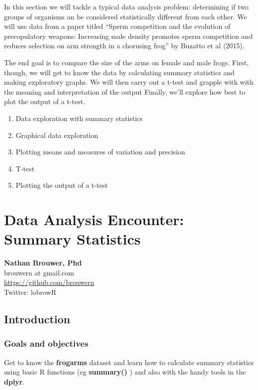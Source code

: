 \documentclass[]{book}
\providecommand{\tightlist}{%
  \setlength{\itemsep}{0pt}\setlength{\parskip}{0pt}}
\theoremstyle{definition}
\theoremstyle{definition}
\theoremstyle{definition}
\theoremstyle{remark}
\begin{document}
In this section we will tackle a typical data analysis problem:
determining if two groups of organisms an be considered statistically
different from each other. We will use data from a paper titled ``Sperm
competition and the evolution of precopulatory weapons: Increasing male
density promotes sperm competition and reduces selection on arm strength
in a chorusing frog'' by Buzatto et al (2015).

The end goal is to compare the size of the arms on female and male
frogs. First, though, we will get to know the data by calculating
summary statistics and making exploratory graphs. We will then carry out
a t-test and grapple with with the meaning and interpretation of the
output Finally, we'll explore how best to plot the output of a t-test.

\begin{enumerate}
\def\labelenumi{\arabic{enumi}.}
\tightlist
\item
  Data exploration with summary statistics
\item
  Graphical data exploration
\item
  Plotting means and measures of variation and precision
\item
  T-test
\item
  Plotting the output of a t-test
\end{enumerate}

\chapter{Data Analysis Encounter: Summary
Statistics}\label{data-analysis-encounter-summary-statistics}

\textbf{Nathan Brouwer, Phd}\\
brouwern at gmail.com\\
\url{https://github.com/brouwern}\\
Twitter: lobrowR

\section{Introduction}\label{introduction-8}

\subsection{Goals and objectives}\label{goals-and-objectives}

Get to know the \textbf{frogarms} dataset and learn how to calculate
summary statistics using basic R functions (eg \textbf{summary()} ) and
also with the handy tools in the \textbf{dplyr}.
\end{document}
